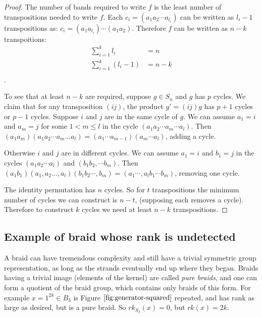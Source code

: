 \documentclass[12pt]{thesis}
\begin{document}
\begin{proof}
    The number of bands required to write $f$
    is the least number of transpositions needed
    to write $f$.
    Each $c_{i} = (a_{1} a_{2} \cdots a_{l_{i}})$ can be written
    as $l_{i} - 1$  transpositions
    as: $c_{i} = (a_{1}a_{l_{i}}) \cdots (a_{1} a_{2})$.
    Therefore $f$ can be written as $n - k$ transpoitions:
    \[
    \begin{split}
        \sum_{i=1}^{k} l_{i} &= n  \\
        \sum_{i=1}^{k} (l_{i} - 1) &= n - k \\
    \end{split}
    \].

    To see that at least $n - k$ are required, suppose $g \in S_{n}$
    and $g$ has $p$ cycles.
    We claim that for any transposition $(i j)$,
    the product $g' = (i j)g$ has $p+1$ cycles 
    or $p - 1$ cycles.
    Suppose $i$ and $j$ are in the same cycle of $g$.
    We can assume $a_{1} = i$ and $a_{m} = j$ for some $1 < m \leq l$ in the cycle $(a_{1} a_{2} \cdots a_{m} \cdots a_{l})$.
    Then $(a_{1} a_{m}) (a_{1} a_{2} \cdots a_{m} \ldots a_{l}) = (a_{1} \cdots a_{m - 1}) (a_{m} \cdots a_{l})$,
    adding a cycle.

    Otherwise $i$ and $j$ are in different cycles.
    We can assume $a_{1} = i$ and $b_{1} = j$ in the cycles $(a_{1} a_{2} \cdots a_{l})$
    and $(b_{1} b_{2}, \cdots b_{m})$.
    Then $(a_{1} b_{1}) (a_{1}, a_{2} \ldots, a_{l}) (b_{1} b_{2} \cdots, b_{m})
    = (a_{1} \cdots, a_{l}b_{1} \cdots b_{m})$,
    removing one cycle.

    The identity permutation has $n$ cycles.
    So for $t$ transpositions the minimum number of
    cycles we can construct is $n - t$,
    (supposing each removes a cycle).
    Therefore to construct $k$ cycles
    we need at least $n - k$ transpositions.
\end{proof}

\subsection{Example of braid whose rank is undetected}

A braid can have tremendous complexity and still have a
trivial symmetric group representation, as long as the strands
eventually end up where they began.
Braids having a trivial image (elements of the kernel) are called \textit{pure braids},
and one can form a quotient of the braid group,
which contains only braids of this form.
For example $x = 1^{2k} \in B_{3}$ is Figure $\ref{fig:generator-squared}$ repeated,
and has rank as large as desired, but is a pure braid.
So $rk_{S_{3}}(x) = 0$, but $rk(x) = 2k$. 
\end{document}
